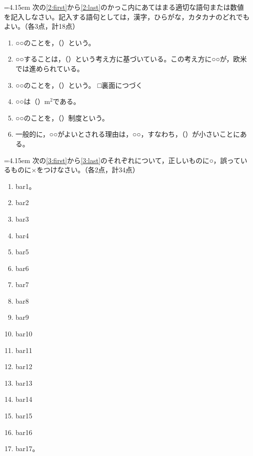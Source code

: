 \documentclass[10pt, a4j, uplatex]{jsarticle}
\newenvironment{question}[1]{%
	\noindent\hangindent=4.15em\hangafter=1{\setlength{\fboxrule}{.4pt}\fbox{\mgfamily\textbf{問題 #1}}}\hspace{.5zw}}%
	{\vspace{.1\baselineskip}}
\begin{document}
\vfill

\begin{question}{２}
次の{\ref{2:first}}から{\ref{2:last}}のかっこ内にあてはまる適切な語句または数値を記入しなさい。記入する語句としては，漢字，ひらがな，カタカナのどれでもよい。（各3点，計18点）

\begin{enumerate}
	\item ○○のことを，（\qquad\qquad\qquad ）という。\label{2:first}
	\item ○○することは，（\qquad\qquad\qquad ）という考え方に基づいている。この考え方に○○が，欧米では進められている。
	\item ○○のことを，（\qquad\qquad\qquad ）という。
\vfill
\hfill □\llap{\ajCheckmark}裏面につづく
\newpage
	\item ○○は（\qquad\qquad\qquad ）$\textrm{m}^2$である。
	\item ○○のことを，（\qquad\qquad\qquad ）制度という。
	\item 一般的に，○○がよいとされる理由は，○○，すなわち，（\qquad\qquad\qquad ）が小さいことにある。\label{2:last}
\end{enumerate}
\end{question}


\vspace{2\baselineskip}
\begin{question}{３}
次の{\ref{3:first}}から{\ref{3:last}}のそれぞれについて，正しいものに○，誤っているものに×をつけなさい。（各2点，計34点）

\begin{enumerate}
	\item bar1。\label{3:first}
	\item bar2
	\item bar3
	\item bar4
	\item bar5
\vspace{.5\baselineskip}
	\item bar6
	\item bar7
	\item bar8
	\item bar9
	\item bar10
\vspace{.5\baselineskip}
	\item bar11
	\item bar12
	\item bar13
	\item bar14
	\item bar15
\vspace{.5\baselineskip}
	\item bar16
	\item bar17。\label{3:last}
\end{enumerate}
\end{question}
\end{document}
